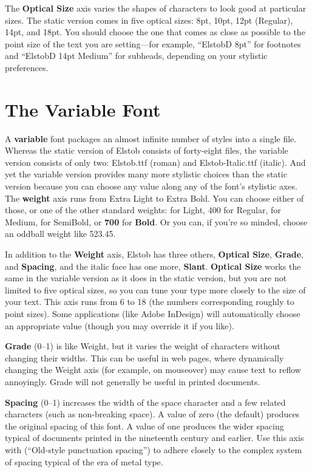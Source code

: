 \documentclass[12pt,letterpaper,openany]{book}
\begin{document}
The \textbf{Optical Size} axis varies the shapes of characters to look good at
particular sizes. The static version comes in five optical sizes: 8pt, 10pt,
12pt (Regular), 14pt, and 18pt. You should choose the one that comes as close
as possible to the point size of the text you are setting---for example, “ElstobD
8pt” for footnotes and “ElstobD 14pt Medium” for subheads, depending on your
stylistic preferences.

\section{The Variable Font}

A \textbf{variable} font packages an almost infinite number
of styles into a single file. Whereas the static version of Elstob consists
of forty-eight files, the variable version consists of only two: Elstob.ttf
(roman) and Elstob-Italic.ttf (italic). And yet the variable version provides
many more stylistic choices than the static version because you can choose any
value along any of the font’s stylistic axes. The \textbf{weight} axis
runs from { Extra Light} to { Extra Bold}. You
can choose either of those, or one of the other standard weights: {} for
{\light Light}, 400 for Regular, {} for {\medium Medium},
{} for {\semibold SemiBold}, or \textbf{700} for \textbf{Bold}.
Or you can, if you’re so minded, choose {\oddball an oddball weight like
523.45}.

In addition to the \textbf{Weight} axis, Elstob has three others, \textbf{Optical
Size}, \textbf{Grade}, and \textbf{Spacing}, and the italic face has one more, \textbf{Slant}.
\textbf{Optical Size} works the same in the variable version as it does in the
static version, but you are not limited to five optical sizes, so you can tune
your type more closely to the size of your text. This axis runs from 6 to
18 (the numbers corresponding roughly to point sizes). Some applications (like
Adobe InDesign) will automatically
choose an appropriate value (though you may override it if you like).

\textbf{Grade}
(0--1) is like Weight, but it varies the weight of characters without changing
their widths. This can be useful in web pages, where dynamically changing the
Weight axis (for example, on mouseover) may cause text to reflow annoyingly. Grade will
not generally be useful in printed documents.

\textbf{Spacing} (0--1) increases the width of the space character and a few
related characters (such as non-breaking space). A value of zero (the default)
produces the original spacing of this font. A value of one produces the wider
spacing typical of documents printed in the nineteenth century and earlier.
Use this axis with  (“Old-style punctuation spacing”) to adhere closely to
the complex system of spacing typical of the era of metal type.
\end{document}
